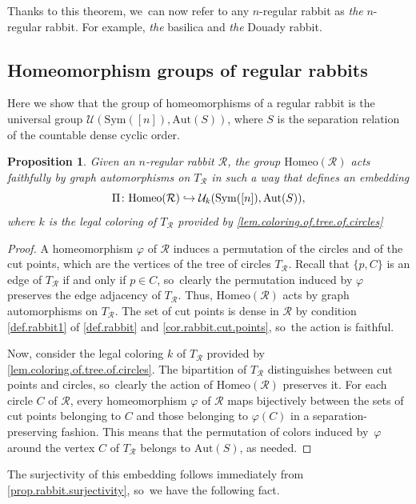 \documentclass[10pt,a4paper]{amsart}
\newtheorem{proposition}[proposition]{Proposition}
\theoremstyle{definition}
\newcommand\hto{\mathrel{\lhook\joinrel\to}}
\newcommand{\Aut}{\mathrm{Aut}}
\newcommand{\Sym}{\mathrm{Sym}}
\newcommand{\Homeo}{\mathrm{Homeo}}
\newcommand{\R}{\mathcal{R}}
\newcommand{\U}{\mathcal{U}}
\begin{document}
Thanks to this theorem, we~can now refer to any $n$-regular rabbit as \textit{the} $n$-regular rabbit.
For example, \textit{the} basilica and \textit{the} Douady rabbit.


\subsection{Homeomorphism groups of regular rabbits}
\label{sub.rabbit.homeo.group.is.universal}

Here we show that the group of homeomorphisms of a regular rabbit is the universal group $\U(\Sym([n]),\Aut(S))$, where $S$ is the separation relation of the countable dense cyclic order.

\begin{proposition}
\label{prop.homeo.rabbit.acts.on.tree}
Given an $n$-regular rabbit $\R$, the group $\Homeo(\R)$ acts faithfully by graph automorphisms on $T_\R$ in such a way that defines an embedding
\[
 \Pi \colon \Homeo(\R) \hto \U_k (\Sym([n]),\Aut(S)), 
\]
where $k$ is the legal coloring of $T_\R$ provided by \cref{lem.coloring.of.tree.of.circles}
\end{proposition}

\begin{proof}
A homeomorphism $\varphi$ of $\R$ induces a permutation of the circles and of the cut points, which are the vertices of the tree of circles $T_\R$.
Recall that $\{p,C\}$ is an edge of $T_\R$ if and only if $p \in C$, so~clearly the permutation induced by $\varphi$ preserves the edge adjacency of $T_\R$.
Thus, $\Homeo(\R)$ acts by graph automorphisms on $T_\R$.
The set of cut points is dense in $\R$ by condition \cref{def.rabbit1} of \cref{def.rabbit} and \cref{cor.rabbit.cut.points}, so~the action is faithful.

Now, consider the legal coloring $k$ of $T_\R$ provided by \cref{lem.coloring.of.tree.of.circles}.
The bipartition of $T_\R$ distinguishes between cut points and circles, so~clearly the action of $\Homeo(\R)$ preserves it.
For each circle $C$ of $\R$, every homeomorphism $\varphi$ of $\R$ maps bijectively between the sets of cut points belonging to $C$ and those belonging to $\varphi(C)$ in a separation-preserving fashion.
This means that the permutation of colors induced by~$\varphi$ around the vertex $C$ of $T_\R$ belongs to $\Aut(S)$, as needed.
\end{proof}

The surjectivity of this embedding follows immediately from \cref{prop.rabbit.surjectivity}, so~we have the following fact.
\end{document}
